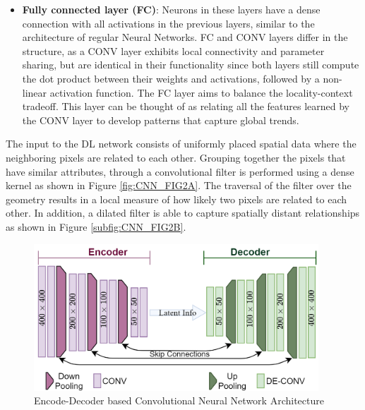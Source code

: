 \begin{itemize}
\item \textbf{Fully connected layer (FC)}: Neurons in these layers have a dense connection with all activations in the previous layers, similar to the architecture of regular Neural Networks. FC and CONV layers differ in the structure, as a CONV layer exhibits local connectivity and parameter sharing, but are identical in their functionality since both layers still compute the dot product between their weights and activations, followed by a non-linear activation function. The FC layer aims to balance the locality-context tradeoff. This layer can be thought of as relating all the features learned by the CONV layer to develop patterns that capture global trends.

\end{itemize}

The input to the DL network consists of uniformly placed spatial data where the neighboring pixels are related to each other. Grouping together the pixels that have similar attributes, through a convolutional filter is performed using a dense kernel as shown in Figure \ref{fig:CNN_FIG2A}. The traversal of the filter over the geometry results in a local measure of how likely two pixels are related to each other. In addition, a dilated filter is able to capture spatially distant relationships as shown in Figure \ref{subfig:CNN_FIG2B}.

\begin{figure}
    \centering
    \includegraphics[width=0.95\textwidth]{Figures/Chp2_CNN/Network_arch.png}
    \caption{Encode-Decoder based Convolutional Neural Network Architecture}
    \label{fig:CNN_NN_arch}
\end{figure}

